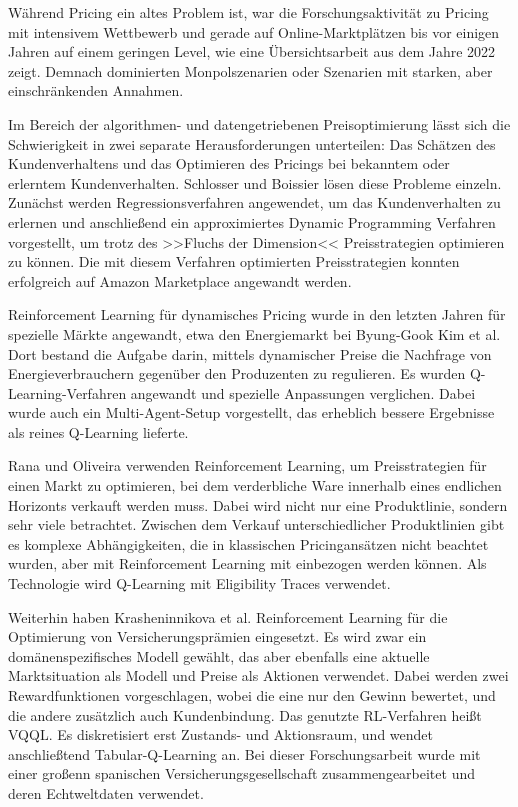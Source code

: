 Während Pricing ein altes Problem ist, war die Forschungsaktivität zu Pricing mit intensivem Wettbewerb und gerade auf Online-Marktplätzen bis vor einigen Jahren auf einem geringen Level, wie eine Übersichtsarbeit aus dem Jahre 2022 zeigt. \cite{Gerpott2022}
Demnach dominierten Monpolszenarien oder Szenarien mit starken, aber einschränkenden Annahmen.

Im Bereich der algorithmen- und datengetriebenen Preisoptimierung lässt sich die Schwierigkeit in zwei separate Herausforderungen unterteilen: Das Schätzen des Kundenverhaltens und das Optimieren des Pricings bei bekanntem oder erlerntem Kundenverhalten.
Schlosser und Boissier \cite{10.1145/3219819.3219833} lösen diese Probleme einzeln.
Zunächst werden Regressionsverfahren angewendet, um das Kundenverhalten zu erlernen und anschließend ein approximiertes Dynamic Programming Verfahren vorgestellt, um trotz des >>Fluchs der Dimension<< Preisstrategien optimieren zu können.
Die mit diesem Verfahren optimierten Preisstrategien konnten erfolgreich auf Amazon Marketplace angewandt werden.

Reinforcement Learning für dynamisches Pricing wurde in den letzten Jahren für spezielle Märkte angewandt, etwa den Energiemarkt bei Byung-Gook Kim et al. \cite{Kim2016DynamicPA}
Dort bestand die Aufgabe darin, mittels dynamischer Preise die Nachfrage von Energieverbrauchern gegenüber den Produzenten zu regulieren.
Es wurden Q-Learning-Verfahren angewandt und spezielle Anpassungen verglichen.
Dabei wurde auch ein Multi-Agent-Setup vorgestellt, das erheblich bessere Ergebnisse als reines Q-Learning lieferte.

Rana und Oliveira \cite{RANA2015426} verwenden Reinforcement Learning, um Preisstrategien für einen Markt zu optimieren, bei dem verderbliche Ware innerhalb eines endlichen Horizonts verkauft werden muss.
Dabei wird nicht nur eine Produktlinie, sondern sehr viele betrachtet.
Zwischen dem Verkauf unterschiedlicher Produktlinien gibt es komplexe Abhängigkeiten, die in klassischen Pricingansätzen nicht beachtet wurden, aber mit Reinforcement Learning mit einbezogen werden können.
Als Technologie wird Q-Learning mit Eligibility Traces verwendet.

Weiterhin haben Krasheninnikova et al. Reinforcement Learning für die Optimierung von Versicherungsprämien eingesetzt.
Es wird zwar ein domänenspezifisches Modell gewählt, das aber ebenfalls eine aktuelle Marktsituation als Modell und Preise als Aktionen verwendet.
Dabei werden zwei Rewardfunktionen vorgeschlagen, wobei die eine nur den Gewinn bewertet, und die andere zusätzlich auch Kundenbindung.
Das genutzte RL-Verfahren heißt VQQL.
Es diskretisiert erst Zustands- und Aktionsraum, und wendet anschließtend Tabular-Q-Learning an.
Bei dieser Forschungsarbeit wurde mit einer großenn spanischen Versicherungsgesellschaft zusammengearbeitet und deren Echtweltdaten verwendet.

